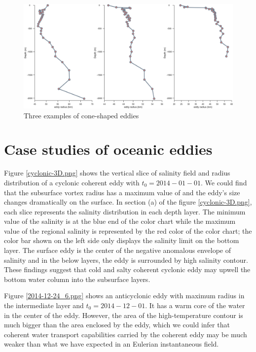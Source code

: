 \begin{figure}[htbp]
    \centering
    \includegraphics[width = 15cm]{chapter/figure/cone-shaped.png}
    \caption{Three examples of cone-shaped eddies}
    \label{cone-shaped.png}
\end{figure}





\section{Case studies of oceanic eddies}

Figure \ref{cyclonic-3D.png} shows the vertical slice of salinity field and radius distribution of a cyclonic coherent eddy with $t_0 = 2014-01-01$. We could find that the subsurface vortex radius has a maximum value of and the eddy's size changes dramatically on the surface. In section (a) of the figure \ref{cyclonic-3D.png}, each slice represents the salinity distribution in each depth layer. The minimum value of the salinity is at the blue end of the color chart while the maximum value of the regional salinity is represented by the red color of the color chart; the color bar shown on the left side  only displays the salinity limit on the bottom layer. The surface eddy is the center of the negative anomalous envelope of salinity and in the below layers, the eddy is surrounded by high salinity contour. These findings suggest that cold and salty coherent cyclonic eddy may upwell the bottom water column into the subsurface layers. 

Figure \ref{2014-12-24_6.png} shows an anticyclonic eddy with maximum radius in the intermediate layer and $t_0 = 2014-12-01$. It has a warm core of the water in the center of the eddy. However, the area of the high-temperature contour is much bigger than the area enclosed by the eddy, which we could infer that coherent water transport capabilities carried by the coherent eddy may be much weaker than what we have expected in an Eulerian instantaneous field.  

